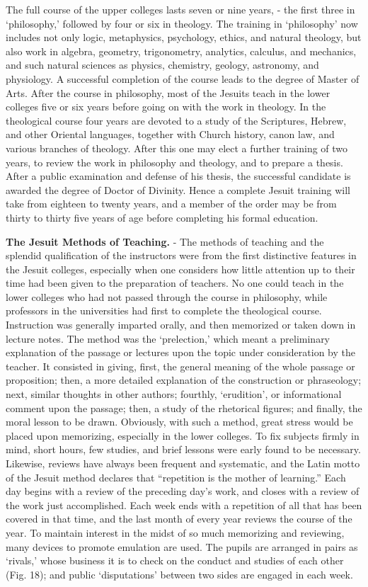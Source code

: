 \documentclass[]{book}
\begin{document}
The full course of the upper colleges lasts seven or nine years, - the first three in `philosophy,' followed by four or six in theology. The training in `philosophy' now includes not only logic, metaphysics, psychology, ethics, and natural theology, but also work in algebra, geometry, trigonometry, analytics, calculus, and mechanics, and such natural sciences as physics, chemistry, geology, astronomy, and physiology. A successful completion of the course leads to the degree of Master of Arts. After the course in philosophy, most of the Jesuits teach in the lower colleges five or six years before going on with the work in theology. In the theological course four years are devoted to a study of the Scriptures, Hebrew, and other Oriental languages, together with Church history, canon law, and various branches of theology. After this one may elect a further training of two years, to review the work in philosophy and theology, and to prepare a thesis. After a public examination and defense of his thesis, the successful candidate is awarded the degree of Doctor of Divinity. Hence a complete Jesuit training will take from eighteen to twenty years, and a member of the order may be from thirty to thirty five years of age before completing his formal education.

\textbf{The Jesuit Methods of Teaching.} - The methods of teaching and the splendid qualification of the instructors were from the first distinctive features in the Jesuit colleges, especially when one considers how little attention up to their time had been given to the preparation of teachers. No one could teach in the lower colleges who had not passed through the course in philosophy, while professors in the universities had first to complete the theological course. Instruction was generally imparted orally, and then memorized or taken down in lecture notes. The method was the `prelection,' which meant a preliminary explanation of the passage or lectures upon the topic under consideration by the teacher. It consisted in giving, first, the general meaning of the whole passage or proposition; then, a more detailed explanation of the construction or phraseology; next, similar thoughts in other authors; fourthly, `erudition', or informational comment upon the passage; then, a study of the rhetorical figures; and finally, the moral lesson to be drawn. Obviously, with such a method, great stress would be placed upon memorizing, especially in the lower colleges. To fix subjects firmly in mind, short hours, few studies, and brief lessons were early found to be necessary. Likewise, reviews have always been frequent and systematic, and the Latin motto of the Jesuit method declares that ``repetition is the mother of learning.'' Each day begins with a review of the preceding day's work, and closes with a review of the work just accomplished. Each week ends with a repetition of all that has been covered in that time, and the last month of every year reviews the course of the year. To maintain interest in the midst of so much memorizing and reviewing, many devices to promote emulation are used. The pupils are arranged in pairs as `rivals,' whose business it is to check on the conduct and studies of each other (Fig. 18); and public `disputations' between two sides are engaged in each week.
\end{document}
